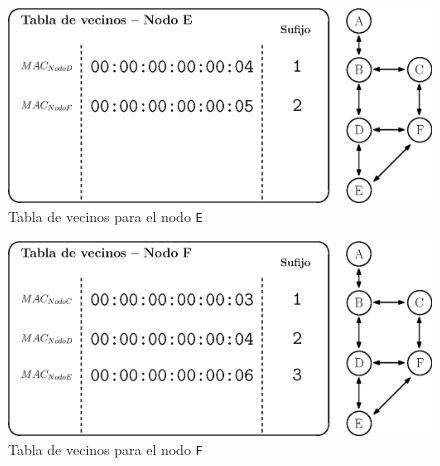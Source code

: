 \begin{figure}[ht!]
    \centering
    \includegraphics[width=\textwidth]{archivos/img/dev/topo_hello_nodoE_nb.eps}
    \caption{Tabla de vecinos para el nodo \texttt{E}}
    \label{fig:topo_hello_nodoE_nb}
\end{figure}


\begin{figure}[ht!]
    \centering
    \includegraphics[width=\textwidth]{archivos/img/dev/topo_hello_nodoF_nb.eps}
    \caption{Tabla de vecinos para el nodo \texttt{F}}
    \label{fig:topo_hello_nodoF_nb}
\end{figure}


